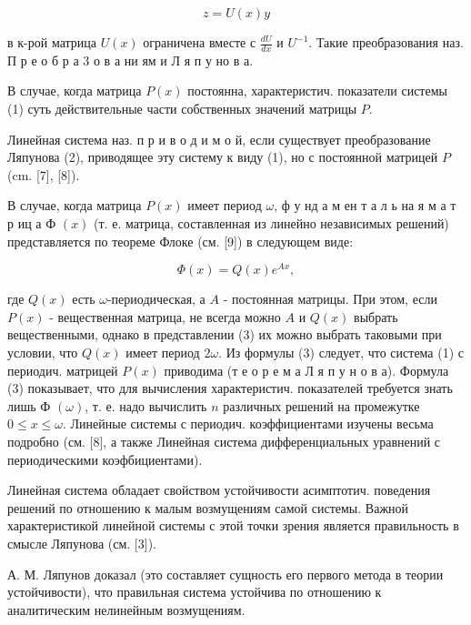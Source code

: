 \documentclass[10pt]{article}
\begin{document}
\[

z=U(x) y

\]



в к-рой матрица $U(x)$ ограничена вместе с $\frac{d U}{d x}$ и $U^{-1}$. Такие преобразования наз. П р е о б р а 3 о в а ни ям и Л я п у но в а.



В случае, когда матрица $P(x)$ постоянна, характеристич. показатели системы (1) суть действительные части собственных значений матрицы $P$.



Линейная система наз. п р и в о д и м о й, если существует преобразование Ляпунова (2), приводящее эту систему к виду (1), но с постоянной матрицей $P$ (cm. [7], [8]).



В случае, когда матрица $P(x)$ имеет период $\omega$, ф у нд а м ен т а л ь на я м а т р иц а Ф $(x)$ (т. е. матрица, составленная из линейно независимых решений) представляется по теореме Флоке (см. [9]) в следующем виде:



\[

\Phi(x)=Q(x) e^{A x},

\]



где $Q(x)$ есть $\omega$-периодическая, а $A$ - постоянная матрицы. При этом, если $P(x)$ - вещественная матрица, не всегда можно $A$ и $Q(x)$ выбрать вещественными, однако в представлении (3) их можно выбрать таковыми при условии, что $Q(x)$ имеет период $2 \omega$. Из формулы (3) следует, что система (1) с периодич. матрицей $P(x)$ приводима (т е о р е м а Л я п у н о в а). Формула (3) показывает, что для вычисления характеристич. показателей требуется знать лишь Ф $(\omega)$, т. е. надо вычислить $n$ различных решений на промежутке $0 \leqslant x \leqslant \omega$. Линейные системы с периодич. коэффициентами изучены весьма подробно (см. [8], а также Линейная система дифференциальных уравнений $с$ периодическими коэфбициентами).



Линейная система обладает свойством устойчивости асимптотич. поведения решений по отношению к малым возмущениям самой системы. Важной характеристикой линейной системы с этой точки зрения является правильность в смысле Ляпунова (см. [3]).



А. М. Ляпунов доказал (это составляет сущность его первого метода в теории устойчивости), что правильная система устойчива по отношению к аналитическим нелинейным возмущениям.
\end{document}
